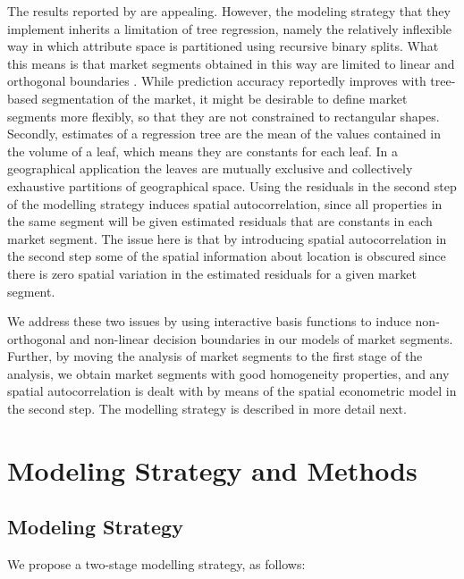 \documentclass[Royal,times,sageh]{sagej}
\begin{document}
The results reported by \citet{Fuss2016role} are appealing. However, the
modeling strategy that they implement inherits a limitation of tree
regression, namely the relatively inflexible way in which attribute
space is partitioned using recursive binary splits. What this means is
that market segments obtained in this way are limited to linear and
orthogonal boundaries \citep[see page 1359 in][]{Fuss2016role}. While
prediction accuracy reportedly improves with tree-based segmentation of
the market, it might be desirable to define market segments more
flexibly, so that they are not constrained to rectangular shapes.
Secondly, estimates of a regression tree are the mean of the values
contained in the volume of a leaf, which means they are constants for
each leaf. In a geographical application the leaves are mutually
exclusive and collectively exhaustive partitions of geographical space.
Using the residuals in the second step of the modelling strategy induces
spatial autocorrelation, since all properties in the same segment will
be given estimated residuals that are constants in each market segment.
The issue here is that by introducing spatial autocorrelation in the
second step some of the spatial information about location is obscured
since there is zero spatial variation in the estimated residuals for a
given market segment.

We address these two issues by using interactive basis functions
\citep{Paez2019inducing} to induce non-orthogonal and non-linear
decision boundaries in our models of market segments. Further, by moving
the analysis of market segments to the first stage of the analysis, we
obtain market segments with good homogeneity properties, and any spatial
autocorrelation is dealt with by means of the spatial econometric model
in the second step. The modelling strategy is described in more detail
next.

\hypertarget{modeling-strategy-and-methods}{%
\section{Modeling Strategy and
Methods}\label{modeling-strategy-and-methods}}

\hypertarget{modeling-strategy}{%
\subsection{Modeling Strategy}\label{modeling-strategy}}

We propose a two-stage modelling strategy, as follows:
\end{document}
